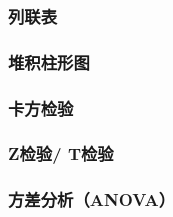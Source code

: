 \subsubsection{列联表}

\subsubsection{堆积柱形图}
\subsubsection{卡方检验}
\subsubsection{Z检验/ T检验}
\subsubsection{方差分析（ANOVA）}

